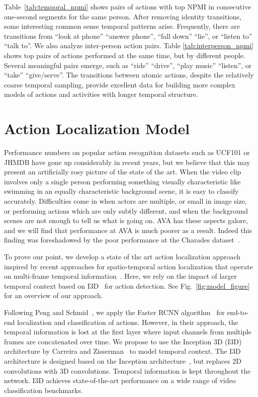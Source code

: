 \documentclass[10pt,twocolumn,letterpaper]{article}
\begin{document}
Table~\ref{tab:temporal_npmi} shows pairs of actions with top NPMI in consecutive one-second segments for the same person. After removing identity transitions, some interesting common sense temporal patterns arise. Frequently, there are transitions from ``look at phone''   ``answer phone'', ``fall down''   ``lie'', or ``listen to''   ``talk to''.  We also analyze inter-person action pairs. Table \ref{tab:interperson_npmi} shows top pairs of actions performed at the same time, but by different people. Several meaningful pairs emerge, such as ``ride''  ``drive'', ``play music''  ``listen'', or ``take''  ``give/serve''. The transitions between atomic actions, despite the relatively coarse temporal sampling, provide excellent data for building more complex models of actions and activities with longer temporal structure.
\vspace{-1em} 
\section{Action Localization Model} 
\label{sec:I3D}

Performance numbers on popular action recognition datasets such as UCF101 or JHMDB have gone up considerably in recent years, but we believe that this may present an artificially rosy picture of the state of the art. When the video clip involves only a single person performing something visually characteristic like swimming in an equally characteristic background scene, it is easy to classify accurately. Difficulties come in when actors are multiple, or small in image size, or performing actions which are only subtly different, and when the background scenes are not enough to tell us what is going on. AVA has these aspects galore, and we will find that performance at AVA is much poorer as a result. Indeed this finding was foreshadowed by the poor performance at the Charades dataset~\cite{charades2016}.

To prove our point, we develop a state of the art action localization approach inspired by recent approaches for spatio-temporal action localization that operate on multi-frame temporal information~\cite{T_CNN_iccv17,tubelets_iccv17}. Here, we rely on the impact of larger temporal context based on I3D~\cite{i3d_cvpr17} for action detection. See Fig.~\ref{fig:model_figure} for an overview of our approach. 

Following Peng and Schmid~\cite{peng2016multi}, we apply the Faster RCNN algorithm~\cite{ren2015faster} for end-to-end localization and classification of actions. However, in their approach, the temporal information is lost at the first layer where input channels from multiple frames are concatenated over time. We propose to use the Inception 3D (I3D) architecture by Carreira and Zisserman~\cite{i3d_cvpr17} to model temporal context. The I3D architecture is designed based on the Inception architecture~\cite{szegedy2015rethinking}, but replaces 2D convolutions with 3D convolutions. Temporal information is kept throughout the network. I3D achieves state-of-the-art performance on a wide range of video classification benchmarks.
\end{document}

